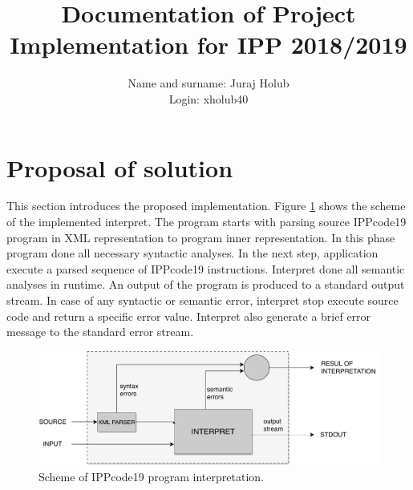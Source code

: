 \documentclass[a4paper, 10pt]{article}
\title{Documentation of Project Implementation for IPP 2018/2019 }
\author{Name and surname: Juraj Holub\\ Login: xholub40}
\date{}
\begin{document}
	\maketitle
	\thispagestyle{empty}

\section{Proposal of solution} \label{proposal}

    This section introduces the proposed implementation. Figure \ref{obr1} shows the scheme of the implemented interpret. The program starts with parsing source IPPcode19 program in XML representation to program inner representation. In this phase program done all necessary syntactic analyses. In the next step, application execute a parsed sequence of IPPcode19 instructions. Interpret done all semantic analyses in runtime. An output of the program is produced to a standard output stream. In case of any syntactic or semantic error, interpret stop execute source code and return a specific error value. Interpret also generate a brief error message to the standard error stream.

\begin{figure}[H] 
	\centering
	\includegraphics[width=.4 \paperwidth]{interpret.pdf}
	\caption{Scheme of IPPcode19 program interpretation.}
	\label{obr1}
\end{figure} 
\end{document}
